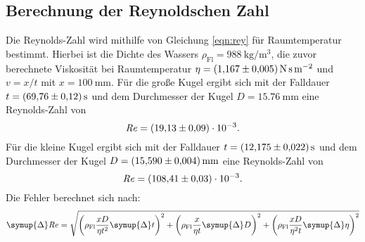 \subsection{Berechnung der Reynoldschen Zahl}
Die Reynolds-Zahl wird mithilfe von Gleichung \eqref{eqn:rey} für Raumtemperatur bestimmt.
Hierbei ist die Dichte des Wassers
\mbox{$\rho_\text{Fl} = \SI[per-mode=reciprocal]{988}{\kg\per\meter\cubed}$},
die zuvor berechnete Viskosität bei Raumtemperatur
\mbox{$\eta = \SI[per-mode=reciprocal]{1.167\pm0.005}{\newton\second\per\meter\squared}$} und
$v=x/t$ mit $x=\SI{100}{\milli\meter}$.
Für die große Kugel ergibt sich mit der Falldauer
\mbox{$t = \SI[per-mode=reciprocal]{69.76\pm0.12}{\second}$} und
dem Durchmesser der Kugel
\mbox{$D = \SI[per-mode=reciprocal]{15.76}{\milli\meter}$}
eine Reynolds-Zahl von
\begin{equation}
    \mathit{R\kern-.04em e} = \num{19.13\pm0.09e-3}.
\end{equation}
%
Für die kleine Kugel ergibt sich mit
der Falldauer
\mbox{$t = \SI[per-mode=reciprocal]{12.175\pm0.022}{\second}$} und
dem Durchmesser der Kugel
\mbox{$D = \SI[per-mode=reciprocal]{15.590\pm0.004}{\milli\meter}$}
eine Reynolds-Zahl von
\begin{equation}
    \mathit{R\kern-.04em e} = \num{108.41\pm0.03e-3}.
\end{equation}
%
Die Fehler berechnet sich nach:
\begin{equation}
    \symup{\Delta}\mathit{R\kern-.04em e} = \sqrt{
        \left(\rho_\text{Fl} \frac{xD}{\eta t^2}\symup{\Delta}t \right)^2 +
        \left(\rho_\text{Fl} \frac{x}{\eta t}\symup{\Delta}D \right)^2 +
        \left(\rho_\text{Fl} \frac{xD}{\eta^2 t}\symup{\Delta}\eta \right)^2
    }
\end{equation}
